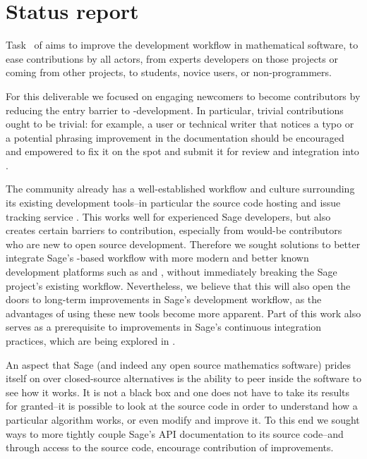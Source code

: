 \hypertarget{status-report}{%
\section{Status report}\label{status-report}}



Task~ of
 aims to improve the development
workflow in mathematical software, to ease contributions by all
actors, from experts developers on those projects or coming from other
projects, to students, novice users, or non-programmers.

For this deliverable we focused on engaging newcomers to become
contributors by reducing the entry barrier to \Sage-development. In
particular, trivial contributions ought to be trivial: for example, a
user or technical writer that notices a typo or a potential phrasing
improvement in the documentation should be encouraged and empowered to
fix it on the spot and submit it for review and integration into \Sage.

The \Sage community already has a
well-established workflow and culture
surrounding its existing development tools--in particular the source code
hosting and issue tracking service \Trac.  This works well for experienced
Sage developers, but also creates certain barriers to contribution, especially
from would-be contributors who are new to open source development.
Therefore
we sought solutions to better integrate Sage's \Trac-based workflow with more
modern and better known development platforms such as \GitHub and \GitLab,
without immediately breaking the Sage project's existing workflow.
%
%
Nevertheless, we believe that this will also open the doors to long-term
improvements in Sage's development workflow, as the advantages of using these
new tools become more apparent.  Part of this work also serves as a
prerequisite to improvements in Sage's continuous integration practices, which
are being explored in
.

An aspect that Sage (and indeed any open source mathematics software) prides
itself on over closed-source alternatives is the ability to peer inside the
software to see how it works.  It is not a black box and one does not have to
take its results for granted--it is possible to look at the source code in
order to understand how a particular algorithm works, or even modify and
improve it.  To this end we sought ways to more tightly couple Sage's API
documentation to its source code--and through access to the source code,
encourage contribution of improvements.

